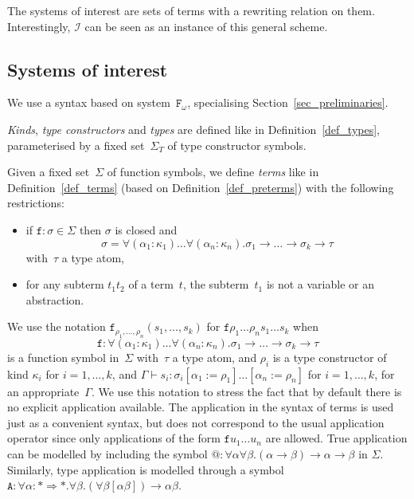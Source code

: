 \documentclass[runningheads,a4paper]{llncs}
\newcommand{\Fomega}{\mathtt{F}_\omega}
\newcommand{\Iterms}{\mathcal{I}}
\newcommand{\arrtype}{\rightarrow}
\newcommand{\arrkind}{\Rightarrow}
\newcommand{\proves}{\vdash}
\begin{document}
The systems of interest are sets of terms with a rewriting relation on
them. Interestingly, $\Iterms$ can be seen as an instance of this
general scheme.

\subsection{Systems of interest}

We use a syntax based on system~$\Fomega$, specialising
Section~\ref{sec_preliminaries}.

\begin{definition}\normalfont
  \emph{Kinds}, \emph{type constructors} and \emph{types} are defined
  like in Definition~\ref{def_types}, parameterised by a fixed
  set~$\Sigma_T$ of type constructor symbols.

  Given a fixed set~$\Sigma$ of function symbols, we define
  \emph{terms} like in Definition~\ref{def_terms} (based on
  Definition~\ref{def_preterms}) with the following restrictions:
  \begin{itemize}
  \item if $\mathtt{f} : \sigma \in \Sigma$ then $\sigma$ is closed and
    \[
    \sigma = \forall (\alpha_1 : \kappa_1) \ldots \forall (\alpha_n : \kappa_n)
    . \sigma_1 \arrtype \ldots \arrtype \sigma_k \arrtype \tau
    \]
    with~$\tau$ a type atom,
  \item for any subterm $t_1 t_2$ of a term~$t$, the subterm~$t_1$ is
    not a variable or an abstraction.
  \end{itemize}
\end{definition}

We use the notation
$\mathtt{f}_{\rho_1,\ldots,\rho_n}(s_1,\ldots,s_k)$ for
$\mathtt{f} \rho_1 \ldots \rho_n s_1 \ldots s_k$ when
\[
  \mathtt{f} : \forall (\alpha_1 : \kappa_1) \ldots
  \forall (\alpha_n : \kappa_n) . \sigma_1 \arrtype \ldots \arrtype
  \sigma_k \arrtype \tau
\]
is a function symbol in~$\Sigma$ with~$\tau$ a type atom, and $\rho_i$
is a type constructor of kind $\kappa_i$ for $i=1,\ldots,k$, and
$\Gamma \proves s_i : \sigma_i[\alpha_1 := \rho_1]\ldots[\alpha_n :=
  \rho_n]$ for $i=1,\ldots,k$, for an appropriate~$\Gamma$. We use
this notation to stress the fact that by default there is no explicit
application available. The application in the syntax of terms is used
just as a convenient syntax, but does not correspond to the usual
application operator since only applications of the form $\mathtt{f}
u_1 \ldots u_n$ are allowed. True application can be modelled by
including the symbol ${@} : \forall\alpha\forall\beta . (\alpha
\arrtype \beta) \arrtype \alpha \arrtype \beta$ in
$\Sigma$. Similarly, type application is modelled through a symbol
$\mathtt{A} : \forall \alpha : * \arrkind * . \forall \beta . (\forall
\beta [\alpha \beta]) \arrtype \alpha \beta$.
\end{document}
